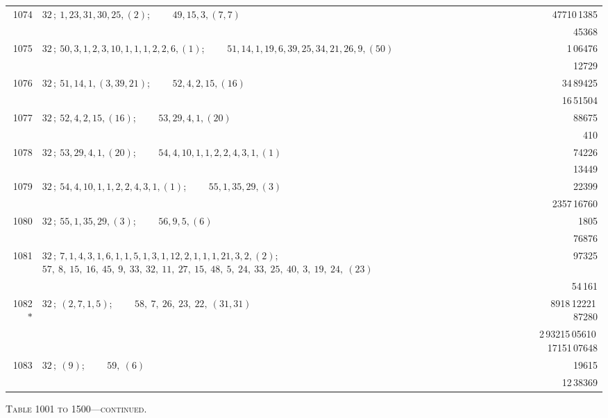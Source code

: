 \documentclass[11pt]{article}
\providecommand{\asterism}{*}
\begin{document}
\begin{longtable}{|r|p{}|r|}
\hline
1074 & $32\,;\ 1, 23, 31, 30, 25, (2)$; \ \ \ \ $49, 15, 3, (7, 7)$ & 47710\,1385 \\
 & & 45368 \\
\hline
1075 & $32\,;\ 50, 3, 1, 2, 3, 10, 1, 1, 1, 2, 2, 6, (1)$; \ \ \ \ $51, 14, 1, 19, 6, 39, 25, 34, 21, 26, 9, (50)$ & 1\,06476 \\
 & & 12729 \\
\hline
1076 & $32\,;\ 51, 14, 1, (3, 39, 21)$; \ \ \ \ $52, 4, 2, 15, (16)$ & 34\,89425 \\
 & & 16\,51504 \\
\hline
1077 & $32\,;\ 52, 4, 2, 15, (16)$; \ \ \ \ $53, 29, 4, 1, (20)$ & 88675 \\
 & & 410 \\
\hline
1078 & $32\,;\ 53, 29, 4, 1, (20)$; \ \ \ \ $54, 4, 10, 1, 1, 2, 2, 4, 3, 1, (1)$ & 74226 \\
 & & 13449 \\
\hline
1079 & $32\,;\ 54, 4, 10, 1, 1, 2, 2, 4, 3, 1, (1)$; \ \ \ \ $55, 1, 35, 29, (3)$ & 22399 \\
 & & 2357\,16760 \\
\hline
1080 & $32\,;\ 55, 1, 35, 29, (3)$; \ \ \ \ $56, 9, 5, (6)$ & 1805 \\
 & & 76876 \\
\hline
1081 & $32\,;\ 7, 1, 4, 3, 1, 6, 1, 1, 5, 1, 3, 1, 12, 2, 1, 1, 1, 21, 3, 2, (2)$; \ \ \ \ $57,\ 8,\ 15,\ 16,\ 45,\ 9,\ 33,\ 32,\ 11,\ 27,\ 15,\ 48,\ 5,\ 24,\ 33,\ 25,\ 40,\ 3,\ 19,\ 24,\ (23)$ & 97325 \\
 & & 54\,161 \\
\hline
1082$\asterism$ & $32\,;\ (2, 7, 1, 5)$; \ \ \ \ $58,\ 7,\ 26,\ 23,\ 22,\ (31, 31)$ & 8918\,12221\,87280 \\
 & & 2\,93215\,05610\,17151\,07648 \\
\hline
1083 & $32\,;\ (9)$; \ \ \ \ $59,\ (6)$ & 19615 \\
 & & 12\,38369 \\
\hline
\end{longtable}

\begin{center}
\small\textsc{Table 1001 to 1500---continued.}
\end{center}
\end{document}
